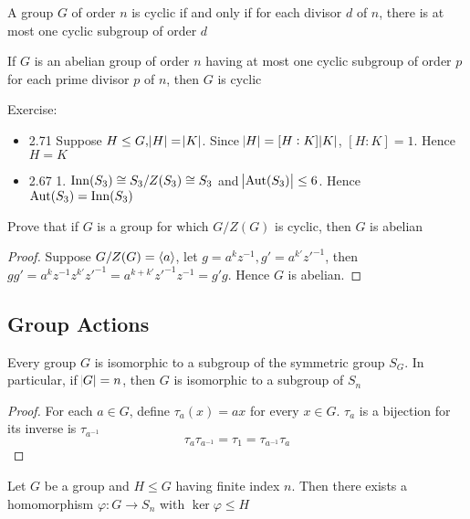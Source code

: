 \documentclass[11pt]{article}
\begin{document}
\begin{theorem}[]
\label{thm2.86}
A group \(G\) of order \(n\) is cyclic if and only if for each divisor \(d\) of
\(n\), there is at most one cyclic subgroup of order \(d\)
\end{theorem}

\begin{theorem}[]
If \(G\) is an abelian group of order \(n\) having at most one cyclic subgroup of
order \(p\) for each prime divisor \(p\) of \(n\), then \(G\) is cyclic
\end{theorem}

Exercise:
\begin{itemize}
\item 2.71 Suppose \(H\le G, \abs{H}=\abs{K}\). Since \(\abs{H}=[H:K]\abs{K}\),
\([H:K]=1\). Hence \(H=K\)
\item 2.67 1. \(\operatorname{Inn}(S_3)\cong S_3/Z(S_3)\cong S_3\) and \(\abs{\operatorname{Aut}(S_3)}\le 6\).
Hence \(\operatorname{Aut}(S_3)=\operatorname{Inn}(S_3)\)
\end{itemize}


\begin{exercise}
\label{ex2.69}
Prove that if \(G\) is a group for which \(G/Z(G)\) is cyclic, then \(G\) is abelian
\end{exercise}
\begin{proof}
Suppose \(G/Z(G)=\langle a\rangle\), let \(g=a^kz^{-1},g'=a^{k'}z'^{-1}\), then 
\(gg'=a^kz^{-1}z^{k'}z'^{-1}=a^{k+k'}z'^{-1}z^{-1}=g'g\). Hence \(G\) is abelian.
\end{proof}
\subsection{Group Actions}
\label{sec:org5bb82b3}
\begin{theorem}[Cayley]
Every group \(G\) is isomorphic to a subgroup of the symmetric group \(S_G\). In
particular, if \(\abs{G}=n\), then \(G\) is isomorphic to a subgroup of \(S_n\)
\end{theorem}

\begin{proof}
For each \(a\in G\), define \(\tau_a(x)=ax\) for every \(x\in G\). \(\tau_a\) is a
bijection for its inverse is \(\tau_{a^{-1}}\)
\begin{equation*}
\tau_a\tau_{a^{-1}}=\tau_1=\tau_{a^{-1}}\tau_a
\end{equation*}
\end{proof}

\begin{theorem}
Let \(G\) be a group and \(H\le G\) having finite index \(n\). Then there exists a
homomorphism \(\varphi:G\to S_n\) with \(\ker\varphi\le H\)
\end{theorem}
\end{document}
